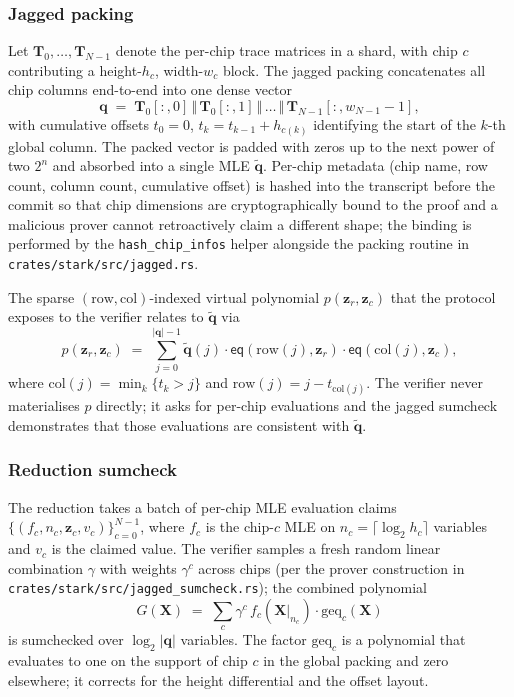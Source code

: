 \subsubsection{Jagged packing}

Let $\mathbf{T}_0, \ldots, \mathbf{T}_{N-1}$ denote the per-chip trace matrices in a shard, with chip $c$ contributing a height-$h_c$, width-$w_c$ block. The jagged packing concatenates all chip columns end-to-end into one dense vector
\[
  \mathbf{q} \;=\; \mathbf{T}_0[:,0] \,\Vert\, \mathbf{T}_0[:,1] \,\Vert\, \ldots \,\Vert\, \mathbf{T}_{N-1}[:, w_{N-1} - 1],
\]
with cumulative offsets $t_0 = 0$, $t_k = t_{k-1} + h_{c(k)}$ identifying the start of the $k$-th global column. The packed vector is padded with zeros up to the next power of two $2^n$ and absorbed into a single MLE $\widetilde{\mathbf q}$. Per-chip metadata (chip name, row count, column count, cumulative offset) is hashed into the transcript before the commit so that chip dimensions are cryptographically bound to the proof and a malicious prover cannot retroactively claim a different shape; the binding is performed by the \texttt{hash\_chip\_infos} helper alongside the packing routine in \texttt{crates/stark/src/jagged.rs}.

The sparse $(\mathrm{row}, \mathrm{col})$-indexed virtual polynomial $p(\bm z_r, \bm z_c)$ that the protocol exposes to the verifier relates to $\widetilde{\mathbf q}$ via
\[
  p(\bm z_r, \bm z_c) \;=\; \sum_{j=0}^{|\mathbf q|-1} \widetilde{\mathbf q}(j) \cdot \mathsf{eq}(\mathrm{row}(j), \bm z_r) \cdot \mathsf{eq}(\mathrm{col}(j), \bm z_c),
\]
where $\mathrm{col}(j) = \min_k \{ t_k > j \}$ and $\mathrm{row}(j) = j - t_{\mathrm{col}(j)}$. The verifier never materialises $p$ directly; it asks for per-chip evaluations and the jagged sumcheck demonstrates that those evaluations are consistent with $\widetilde{\mathbf q}$.

\subsubsection{Reduction sumcheck}

The reduction takes a batch of per-chip MLE evaluation claims $\{ (f_c, n_c, \bm z_c, v_c) \}_{c=0}^{N-1}$, where $f_c$ is the chip-$c$ MLE on $n_c = \lceil \log_2 h_c \rceil$ variables and $v_c$ is the claimed value. The verifier samples a fresh random linear combination $\gamma$ with weights $\gamma^c$ across chips (per the prover construction in \texttt{crates/stark/src/jagged\_sumcheck.rs}); the combined polynomial
\[
  G(\bm X) \;=\; \sum_c \gamma^c\, f_c(\bm X|_{n_c}) \cdot \mathrm{geq}_c(\bm X)
\]
is sumchecked over $\log_2 |\mathbf q|$ variables. The factor $\mathrm{geq}_c$ is a polynomial that evaluates to one on the support of chip $c$ in the global packing and zero elsewhere; it corrects for the height differential and the offset layout.

